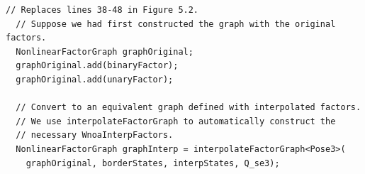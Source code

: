 \documentclass[border=1pt]{standalone}
\begin{document}
\begin{listingbox}
\begin{lstlisting}[style=C++Style, firstnumber=38]
  // Replaces lines 38-48 in Figure 5.2.
  // Suppose we had first constructed the graph with the original factors.
  NonlinearFactorGraph graphOriginal;
  graphOriginal.add(binaryFactor);
  graphOriginal.add(unaryFactor);

  // Convert to an equivalent graph defined with interpolated factors.
  // We use interpolateFactorGraph to automatically construct the
  // necessary WnoaInterpFactors.
  NonlinearFactorGraph graphInterp = interpolateFactorGraph<Pose3>(
    graphOriginal, borderStates, interpStates, Q_se3);
\end{lstlisting}
\end{listingbox}
\end{document}
